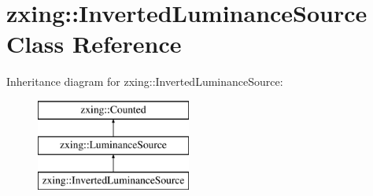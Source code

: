 \hypertarget{classzxing_1_1_inverted_luminance_source}{}\section{zxing\+:\+:Inverted\+Luminance\+Source Class Reference}
\label{classzxing_1_1_inverted_luminance_source}
Inheritance diagram for zxing\+:\+:Inverted\+Luminance\+Source\+:\begin{figure}[H]
\begin{center}
\leavevmode
\includegraphics[height=3.000000cm]{classzxing_1_1_inverted_luminance_source}
\end{center}
\end{figure}
